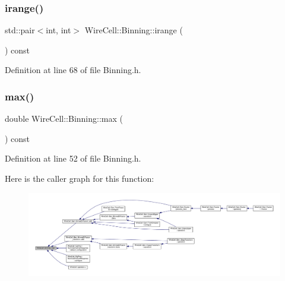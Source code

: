 \subsubsection{\texorpdfstring{irange()}{irange()}}
{\footnotesize\ttfamily std\+::pair$<$int, int$>$ Wire\+Cell\+::\+Binning\+::irange (\begin{DoxyParamCaption}{ }\end{DoxyParamCaption}) const\hspace{0.3cm}{\ttfamily [inline]}}



Definition at line 68 of file Binning.\+h.

\mbox{\label{class_wire_cell_1_1_binning_a91e6fb550bd6cac95e1e61be625583fe}} 
\subsubsection{\texorpdfstring{max()}{max()}}
{\footnotesize\ttfamily double Wire\+Cell\+::\+Binning\+::max (\begin{DoxyParamCaption}{ }\end{DoxyParamCaption}) const\hspace{0.3cm}{\ttfamily [inline]}}



Definition at line 52 of file Binning.\+h.

Here is the caller graph for this function\+:
\nopagebreak
\begin{figure}[H]
\begin{center}
\leavevmode
\includegraphics[width=350pt]{class_wire_cell_1_1_binning_a91e6fb550bd6cac95e1e61be625583fe_icgraph}
\end{center}
\end{figure}
\mbox{\label{class_wire_cell_1_1_binning_a5c7eadf5a87f443a18b93d18f1707372}} 
